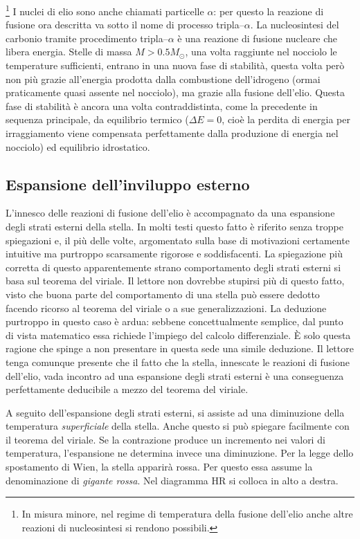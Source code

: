 \footnote{In misura minore, nel regime di temperatura della fusione dell'elio anche altre reazioni di nucleosintesi si rendono possibili.}
I nuclei di elio sono anche chiamati particelle $\alpha$: per questo la reazione di fusione ora descritta va sotto il nome di processo tripla--$\alpha$. La nucleosintesi del carbonio tramite procedimento tripla--$\alpha$ è una reazione di fusione nucleare che libera energia. Stelle di massa $M>0.5 M_{\odot}$, una volta raggiunte nel nocciolo le temperature sufficienti, entrano in una nuova fase di stabilit\`{a}, questa volta però non più grazie all'energia prodotta dalla combustione dell'idrogeno (ormai praticamente quasi assente nel nocciolo), ma grazie alla fusione dell'elio. Questa fase di stabilit\`{a} è ancora una volta contraddistinta, come la precedente in sequenza principale, da equilibrio termico ($\Delta E=0$, cioè la perdita di energia per irraggiamento viene compensata perfettamente dalla produzione di energia nel nocciolo) ed equilibrio idrostatico.
\subsection{Espansione dell'inviluppo esterno}
L'innesco delle reazioni di fusione dell'elio è accompagnato da una espansione degli strati esterni della stella.
In molti testi questo fatto è riferito senza troppe spiegazioni e, il più delle volte, argomentato sulla base di motivazioni certamente intuitive ma purtroppo scarsamente rigorose e soddisfacenti. La spiegazione più corretta di questo apparentemente strano comportamento degli strati esterni si basa sul teorema del viriale. Il lettore non dovrebbe stupirsi più di questo fatto, visto che buona parte del comportamento di una stella può essere dedotto facendo ricorso al teorema del viriale o a sue generalizzazioni. La deduzione purtroppo in questo caso è ardua: sebbene concettualmente semplice, dal punto di vista matematico essa richiede l'impiego del calcolo differenziale. \`E solo questa ragione che spinge a non presentare in questa sede una simile deduzione. Il lettore tenga comunque presente che il fatto che la stella, innescate le reazioni di fusione dell'elio, vada incontro ad una espansione degli strati esterni è una conseguenza perfettamente deducibile a mezzo del teorema del viriale.
\par
A seguito dell'espansione degli strati esterni, si assiste ad una diminuzione della temperatura \emph{superficiale} della stella. Anche questo si può spiegare facilmente con il teorema del viriale. Se la contrazione produce un incremento nei valori di temperatura, l'espansione ne determina invece una diminuzione. Per la legge dello spostamento di Wien, la stella apparir\`{a} rossa. Per questo essa assume la denominazione di \emph{gigante rossa}. Nel diagramma HR si colloca in alto a destra.
